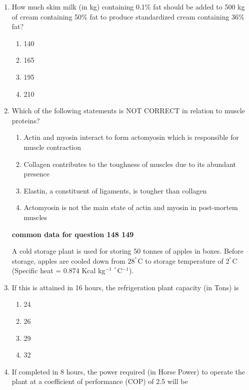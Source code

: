 \documentclass[journal,12pt,onecolumn]{IEEEtran}
\theoremstyle{remark}
\begin{document}
\begin{enumerate}
\item How much skim milk (in kg) containing 0.1\% fat should be added to 500 kg of cream containing 50\% fat to produce standardized cream containing 36\% fat?
\begin{multicols}{2}
\begin{enumerate}
\item 140
\item 165
\item 195
\item 210
\end{enumerate}
\end{multicols}

\item Which of the following statements is NOT CORRECT in relation to muscle proteins?
\begin{multicols}{2}
\begin{enumerate}
\item Actin and myosin interact to form actomyosin which is responsible for muscle contraction
\item Collagen contributes to the toughness of muscles due to its abundant presence
\item Elastin, a constituent of ligaments, is tougher than collagen
\item Actomyosin is not the main state of actin and myosin in post-mortem muscles
\end{enumerate}
\end{multicols}

\textbf{common data for question 148 149}

A cold storage plant is used for storing 50 tonnes of apples in boxes. Before storage, apples are cooled down from 28$^\degree$C to storage temperature of 2$^\degree$C (Specific heat = 0.874 Kcal kg$^{-1}$ $^\degree$C$^{-1}$).

\item If this is attained in 16 hours, the refrigeration plant capacity (in Tons) is

\begin{multicols}{2}
\begin{enumerate}
    \item 24
    \item 26
    \item 29
    \item 32
\end{enumerate}
\end{multicols}

\item If completed in 8 hours, the power required (in Horse Power) to operate the plant at a coefficient of performance (COP) of 2.5 will be


\end{enumerate}
\end{document}

